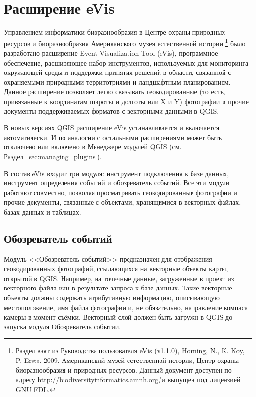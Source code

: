 
\section{Расширение eVis}\label{sec:evis}

Управлением информатики биоразнообразия в Центре охраны природных ресурсов
и биоразнообразия Американского музея естественной истории \footnote{Раздел
взят из Руководства пользователя eVis (v1.1.0), Horning, N., K. Koy, P.
Ersts. 2009. Американский музей естественной истории, Центр охраны
биоразнообразия и природных ресурсов. Данный документ доступен по адресу
\url{http://biodiversityinformatics.amnh.org/}и выпущен под лицензией GNU FDL.}
было разработано расширение Event Visualization Tool (eVis),
программное обеспечение, расширяющее набор инструментов, используемых для
мониторинга окружающей среды и поддержки принятия решений в области,
связанной с охраняемыми природными территотриями и ландшафтным планированием.
Данное расширение позволяет легко связывать геокодированные (то есть,
привязанные к координатам широты и долготы или X и Y) фотографии и прочие
документы поддерживаемых форматов с векторными данными в QGIS.

В новых версиях QGIS расширение eVis устанавливается и включается
автоматически. И по аналогии с остальными расширениями может быть
отключено или включено в Менеджере модулей QGIS (см. Раздел~\ref{sec:managing_plugins}).

В состав eVis входит три модуля: инструмент подключения к базе данных,
инструмент определения событий и обозреватель событий. Все эти модули
работают совместно, позволяя просматривать геокодированные фотографии
и прочие документы, связанные с объектами, хранящимися в векторных файлах,
базах данных и таблицах.

\subsection{Обозреватель событий}\label{evis_browser}

Модуль <<Обозреватель событий>> предназначен для отображения геокодированных
фотографий, ссылающихся на векторные объекты карты, открытой в QGIS. Например,
на точечные данные, загруженные в проект из векторного файла или в результате
запроса к базе данных. Такие векторные объекты должны содержать атрибутивную
информацию, описывающую местоположение, имя файла фотографии и, не
обязательно, направление компаса камеры в момент съёмки. Векторный слой
должен быть загружн в QGIS до запуска модуля Обозреватель событий.

